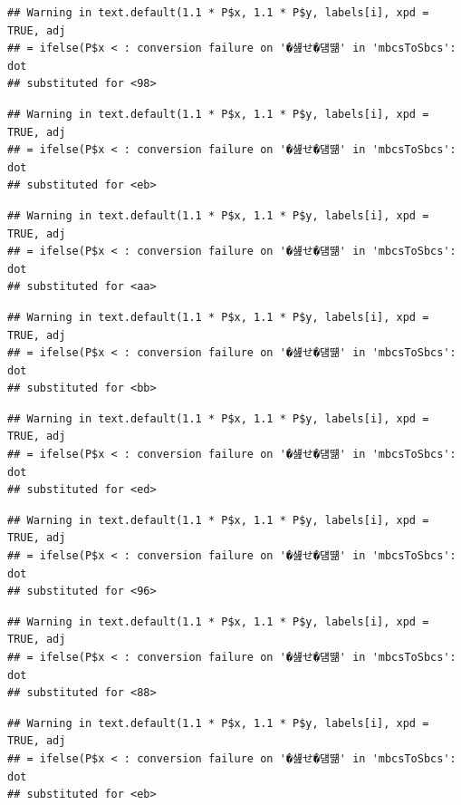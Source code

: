 \documentclass[
]{article}
\begin{document}
\begin{verbatim}
## Warning in text.default(1.1 * P$x, 1.1 * P$y, labels[i], xpd = TRUE, adj
## = ifelse(P$x < : conversion failure on '�섎せ�덈떎' in 'mbcsToSbcs': dot
## substituted for <98>
\end{verbatim}

\begin{verbatim}
## Warning in text.default(1.1 * P$x, 1.1 * P$y, labels[i], xpd = TRUE, adj
## = ifelse(P$x < : conversion failure on '�섎せ�덈떎' in 'mbcsToSbcs': dot
## substituted for <eb>
\end{verbatim}

\begin{verbatim}
## Warning in text.default(1.1 * P$x, 1.1 * P$y, labels[i], xpd = TRUE, adj
## = ifelse(P$x < : conversion failure on '�섎せ�덈떎' in 'mbcsToSbcs': dot
## substituted for <aa>
\end{verbatim}

\begin{verbatim}
## Warning in text.default(1.1 * P$x, 1.1 * P$y, labels[i], xpd = TRUE, adj
## = ifelse(P$x < : conversion failure on '�섎せ�덈떎' in 'mbcsToSbcs': dot
## substituted for <bb>
\end{verbatim}

\begin{verbatim}
## Warning in text.default(1.1 * P$x, 1.1 * P$y, labels[i], xpd = TRUE, adj
## = ifelse(P$x < : conversion failure on '�섎せ�덈떎' in 'mbcsToSbcs': dot
## substituted for <ed>
\end{verbatim}

\begin{verbatim}
## Warning in text.default(1.1 * P$x, 1.1 * P$y, labels[i], xpd = TRUE, adj
## = ifelse(P$x < : conversion failure on '�섎せ�덈떎' in 'mbcsToSbcs': dot
## substituted for <96>
\end{verbatim}

\begin{verbatim}
## Warning in text.default(1.1 * P$x, 1.1 * P$y, labels[i], xpd = TRUE, adj
## = ifelse(P$x < : conversion failure on '�섎せ�덈떎' in 'mbcsToSbcs': dot
## substituted for <88>
\end{verbatim}

\begin{verbatim}
## Warning in text.default(1.1 * P$x, 1.1 * P$y, labels[i], xpd = TRUE, adj
## = ifelse(P$x < : conversion failure on '�섎せ�덈떎' in 'mbcsToSbcs': dot
## substituted for <eb>
\end{verbatim}
\end{document}
